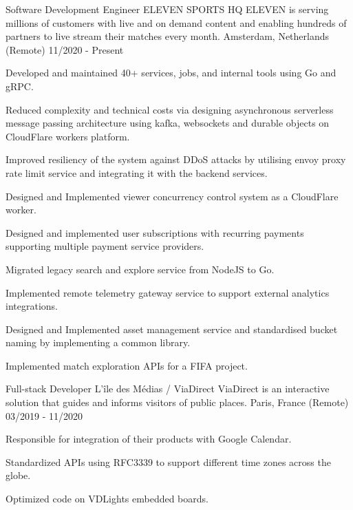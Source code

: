 
\begin{cventries}

  \cventry
    {Software Development Engineer} %
    {ELEVEN SPORTS HQ} %
    {ELEVEN is serving millions of customers with live and on demand content and enabling hundreds of partners to live stream their matches every month.}
    {Amsterdam, Netherlands (Remote)} %
    {11/2020 - Present} %
    {
      \begin{cvitems}
        \item{Developed and maintained 40+ services, jobs, and internal tools using Go and gRPC.}
        \item{Reduced complexity and technical costs via designing asynchronous serverless message passing architecture using kafka, websockets and durable objects on CloudFlare workers platform.}
        \item{Improved resiliency of the system against DDoS attacks by utilising envoy proxy rate limit service and integrating it with the backend services.}
        \item{Designed and Implemented viewer concurrency control system as a CloudFlare worker.}
        \item{Designed and implemented user subscriptions with recurring payments supporting multiple payment service providers.}
        \item{Migrated legacy search and explore service from NodeJS to Go.}
        \item{Implemented remote telemetry gateway service to support external analytics integrations.}
        \item{Designed and Implemented asset management service and standardised bucket naming by implementing a common library.}
        \item{Implemented match exploration APIs for a FIFA project.}
      \end{cvitems}
    }

  \cventry
    {Full-stack Developer} %
    {L'île des Médias / ViaDirect} %
    {ViaDirect is an interactive solution that guides and informs visitors of public places.}
    {Paris, France (Remote)} %
    {03/2019 - 11/2020} %
    {
      \begin{cvitems}
        \item{Responsible for integration of their products with Google Calendar.}
        \item{Standardized APIs using RFC3339 to support different time zones across the globe.}
        \item{Optimized code on VDLights embedded boards.}
      \end{cvitems}
    }


\end{cventries}
